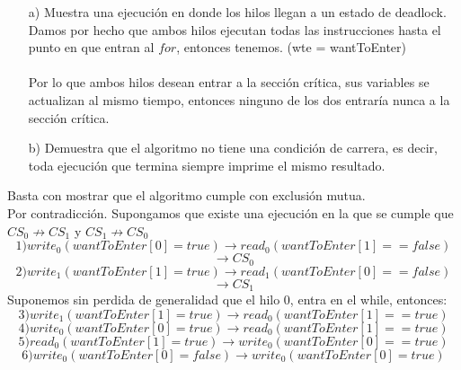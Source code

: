 \documentclass[12pt, letterpaper]{article}
\begin{document}
\begin{itemize}
\begin{itemize}
\item[a) ]Muestra una ejecuci\'on en donde los hilos llegan a un estado de deadlock.\\
Damos por hecho que ambos hilos ejecutan todas las instrucciones hasta el punto en que entran al $for$, entonces tenemos. (wte = wantToEnter)\\ 
\\
Por lo que ambos hilos desean entrar a la sección crítica, sus variables se actualizan al mismo tiempo, entonces ninguno de los dos entraría nunca a la sección crítica.

\item[b) ] Demuestra que el algoritmo no tiene una condici\'on de carrera, es decir, toda ejecución que termina siempre imprime el mismo resultado.
\end{itemize}
Basta con mostrar que el algoritmo cumple con exclusión mutua.\\
Por contradicción. Supongamos que existe una ejecución en la que se cumple que $CS_0 \nrightarrow CS_1$ y $CS_1 \nrightarrow CS_0$\\
$$1) write_0(wantToEnter[0] = true) \rightarrow read_0(wantToEnter[1] == false)$$ $$\rightarrow CS_0$$
$$2) write_1(wantToEnter[1] = true) \rightarrow read_1(wantToEnter[0] == false)$$ $$\rightarrow CS_1$$
Suponemos sin perdida de generalidad que el hilo 0, entra en el while, entonces:\\
$$3) write_1 (wantToEnter[1] = true) \rightarrow read_0 (wantToEnter[1] == true)$$
$$4) write_0 (wantToEnter[0] = true) \rightarrow read_0(wantToEnter[1] == true)$$
$$5) read_0 (wantToEnter[1] = true) \rightarrow write_0(wantToEnter[0] == true)$$
$$6) write_0 (wantToEnter[0] = false) \rightarrow write_0 (wantToEnter[0] = true)$$


\end{itemize}
\end{document}
